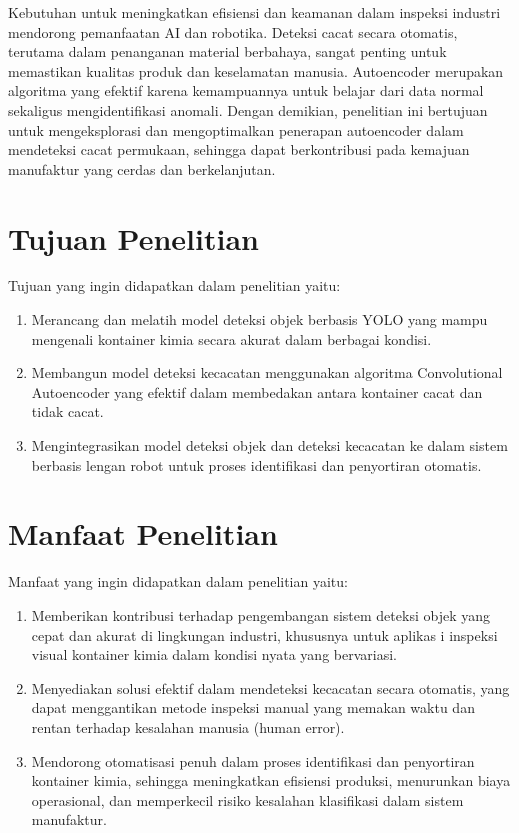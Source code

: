 Kebutuhan untuk meningkatkan efisiensi dan keamanan dalam inspeksi
industri mendorong pemanfaatan AI dan robotika. Deteksi cacat secara
otomatis, terutama dalam penanganan material berbahaya, sangat
penting untuk memastikan kualitas produk dan keselamatan manusia.
Autoencoder merupakan algoritma yang efektif karena kemampuannya
untuk belajar dari data normal sekaligus mengidentifikasi anomali.
Dengan demikian, penelitian ini bertujuan untuk mengeksplorasi dan
mengoptimalkan penerapan autoencoder dalam mendeteksi cacat
permukaan, sehingga dapat berkontribusi pada kemajuan manufaktur yang
cerdas dan berkelanjutan. \\

\section{Tujuan Penelitian}
Tujuan yang ingin didapatkan dalam penelitian yaitu:
\begin{enumerate}
  \item Merancang dan melatih model deteksi objek berbasis YOLO yang
    mampu mengenali kontainer kimia secara akurat dalam berbagai kondisi.
  \item Membangun model deteksi kecacatan menggunakan algoritma
    Convolutional Autoencoder yang efektif dalam membedakan antara
    kontainer cacat dan tidak cacat.
  \item Mengintegrasikan model deteksi objek dan deteksi kecacatan ke
    dalam sistem berbasis lengan robot untuk proses identifikasi dan
    penyortiran otomatis. \\
\end{enumerate}

\section{Manfaat Penelitian}
Manfaat yang ingin didapatkan dalam penelitian yaitu:
\begin{enumerate}
  \item Memberikan kontribusi terhadap pengembangan sistem deteksi
    objek yang cepat dan akurat di lingkungan industri, khususnya
    untuk aplikas i inspeksi visual kontainer kimia dalam kondisi
    nyata yang bervariasi.
  \item Menyediakan solusi efektif dalam mendeteksi kecacatan secara
    otomatis, yang dapat menggantikan metode inspeksi manual yang
    memakan waktu dan rentan terhadap kesalahan manusia (human error).
  \item Mendorong otomatisasi penuh dalam proses identifikasi dan
    penyortiran kontainer kimia, sehingga meningkatkan efisiensi
    produksi, menurunkan biaya operasional, dan memperkecil risiko
    kesalahan klasifikasi dalam sistem manufaktur.
\end{enumerate}
